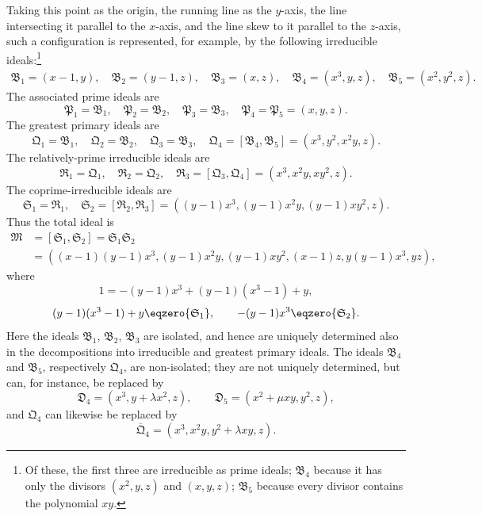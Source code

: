 \documentclass[11pt]{article}
\newcommand{\ideal}[1]{\mathfrak{#1}}
\begin{document}
Taking this point as the origin, the running line as the $y$-axis, the line intersecting it parallel to the $x$-axis, and the line skew to it parallel to the $z$-axis, such a configuration is represented, for example, by the following irreducible ideals:\footnote{Of these, the first three are irreducible as prime ideals; $\ideal B_4$ because it has only the divisors $(x^2,y,z)$ and $(x,y,z)$; $\ideal B_5$ because every divisor contains the polynomial $xy$.}
\[
\begin{gathered}
 \ideal B_1=(x-1,y),\quad
 \ideal B_2=(y-1,z),\quad
 \ideal B_3=(x,z),\quad
 \ideal B_4=(x^3,y,z),\quad
 \ideal B_5=(x^2,y^2,z).
\end{gathered}
\]
The associated prime ideals are
\[
 \ideal P_1=\ideal B_1,
 \quad \ideal P_2=\ideal B_2,
 \quad \ideal P_3=\ideal B_3,
 \quad \ideal P_4=\ideal P_5=(x,y,z).
\]
The greatest primary ideals are
\[
 \ideal Q_1=\ideal B_1,
 \quad \ideal Q_2=\ideal B_2,
 \quad \ideal Q_3=\ideal B_3,
 \quad \ideal Q_4=[\ideal B_4,\ideal B_5]=(x^3,y^2,x^2y,z).
\]
The relatively-prime irreducible ideals are
\[
 \ideal R_1=\ideal Q_1,
 \quad \ideal R_2=\ideal Q_2,
 \quad \ideal R_3=[\ideal Q_3,\ideal Q_4]=(x^3,x^2y,xy^2,z).
\]
The coprime-irreducible ideals are
\[
 \ideal S_1=\ideal R_1,
 \quad
 \ideal S_2=[\ideal R_2,\ideal R_3]=((y-1)x^3,(y-1)x^2y,(y-1)xy^2,z).
\]
Thus the total ideal is
\[
\begin{aligned}
 \ideal M&=[\ideal S_1,\ideal S_2]=\ideal S_1\ideal S_2 \\
 &=((x-1)(y-1)x^3,(y-1)x^2y,(y-1)xy^2,(x-1)z,y(y-1)x^3,yz),
\end{aligned}
\]
where
\[
 1=-(y-1)x^3+(y-1)(x^3-1)+y,
\]
\[
 (y-1)(x^3-1)+y\eqzero{\ideal S_1},
 \qquad -(y-1)x^3\eqzero{\ideal S_2}.
\]
Here the ideals $\ideal B_1$, $\ideal B_2$, $\ideal B_3$ are isolated, and hence are uniquely determined also in the decompositions into irreducible and greatest primary ideals. The ideals $\ideal B_4$ and $\ideal B_5$, respectively $\ideal Q_4$, are non-isolated; they are not uniquely determined, but can, for instance, be replaced by
\[
 \ideal D_4=(x^3,y+\lambda x^2,z),
 \qquad
 \ideal D_5=(x^2+\mu xy,y^2,z),
\]
and $\ideal Q_4$ can likewise be replaced by
\[
 \overline{\ideal Q}_4=(x^3,x^2y,y^2+\lambda xy,z).
\]
\end{document}
